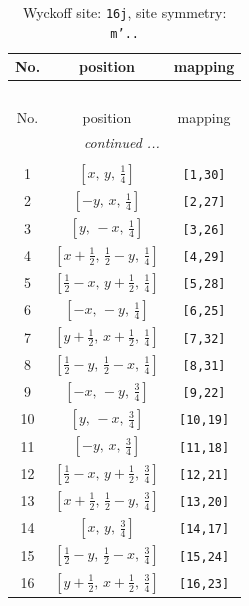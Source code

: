 \documentclass[fleqn,8pt]{jsarticle}
\begin{document}
\renewcommand{\arraystretch}{1.2}
\begin{longtable}{ccc}
\caption{Wyckoff site: {\tt 16j}, site symmetry: {\tt m'..}}
 \\
 \hline \hline
No. & position & mapping \\ \hline \endfirsthead

\multicolumn{2}{l}{\tablename\ \thetable{}} \\
 \hline \hline
No. & position & mapping \\ \hline \endhead

 \hline \hline
\multicolumn{2}{r}{\footnotesize\it continued ...} \\ \endfoot

 \hline \hline
\multicolumn{2}{r}{} \\ \endlastfoot

1 & $\left[ x,\, y,\, \frac{1}{4} \right]$ & {\tt [1,30]} \\ \hline
2 & $\left[ - y,\, x,\, \frac{1}{4} \right]$ & {\tt [2,27]} \\ \hline
3 & $\left[ y,\, - x,\, \frac{1}{4} \right]$ & {\tt [3,26]} \\ \hline
4 & $\left[ x + \frac{1}{2},\, \frac{1}{2} - y,\, \frac{1}{4} \right]$ & {\tt [4,29]} \\ \hline
5 & $\left[ \frac{1}{2} - x,\, y + \frac{1}{2},\, \frac{1}{4} \right]$ & {\tt [5,28]} \\ \hline
6 & $\left[ - x,\, - y,\, \frac{1}{4} \right]$ & {\tt [6,25]} \\ \hline
7 & $\left[ y + \frac{1}{2},\, x + \frac{1}{2},\, \frac{1}{4} \right]$ & {\tt [7,32]} \\ \hline
8 & $\left[ \frac{1}{2} - y,\, \frac{1}{2} - x,\, \frac{1}{4} \right]$ & {\tt [8,31]} \\ \hline
9 & $\left[ - x,\, - y,\, \frac{3}{4} \right]$ & {\tt [9,22]} \\ \hline
10 & $\left[ y,\, - x,\, \frac{3}{4} \right]$ & {\tt [10,19]} \\ \hline
11 & $\left[ - y,\, x,\, \frac{3}{4} \right]$ & {\tt [11,18]} \\ \hline
12 & $\left[ \frac{1}{2} - x,\, y + \frac{1}{2},\, \frac{3}{4} \right]$ & {\tt [12,21]} \\ \hline
13 & $\left[ x + \frac{1}{2},\, \frac{1}{2} - y,\, \frac{3}{4} \right]$ & {\tt [13,20]} \\ \hline
14 & $\left[ x,\, y,\, \frac{3}{4} \right]$ & {\tt [14,17]} \\ \hline
15 & $\left[ \frac{1}{2} - y,\, \frac{1}{2} - x,\, \frac{3}{4} \right]$ & {\tt [15,24]} \\ \hline
16 & $\left[ y + \frac{1}{2},\, x + \frac{1}{2},\, \frac{3}{4} \right]$ & {\tt [16,23]} \\
\end{longtable}
\end{document}
